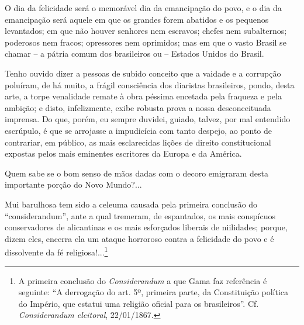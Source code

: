 O dia da felicidade será o memorável dia da emancipação do povo, e o dia
da emancipação será aquele em que os grandes forem abatidos e os
pequenos levantados; em que não houver senhores nem escravos; chefes nem
subalternos; poderosos nem fracos; opressores nem oprimidos; mas em que
o vasto Brasil se chamar -- a pátria comum dos brasileiros ou -- Estados
Unidos do Brasil.

Tenho ouvido dizer a pessoas de subido conceito que a vaidade e a
corrupção poluíram, de há muito, a frágil consciência dos diaristas
brasileiros, pondo, desta arte, a torpe venalidade remate à obra péssima
encetada pela fraqueza e pela ambição; e disto, infelizmente, exibe
robusta prova a nossa desconceituada imprensa. Do que, porém, eu sempre
duvidei, guiado, talvez, por mal entendido escrúpulo, é que se arrojasse
a impudicícia com tanto despejo, ao ponto de contrariar, em público, as
mais esclarecidas lições de direito constitucional expostas pelos mais
eminentes escritores da Europa e da América.

Quem sabe se o bom senso de mãos dadas com o decoro emigraram desta
importante porção do Novo Mundo?...

Mui barulhosa tem sido a celeuma causada pela primeira conclusão do
``considerandum'', ante a qual tremeram, de espantados, os mais conspícuos
conservadores de alicantinas e os mais esforçados liberais de
niilidades; porque, dizem eles, encerra ela um ataque horroroso contra a
felicidade do povo e é dissolvente da fé religiosa!...\footnote{A
  primeira conclusão do \emph{Considerandum} a que Gama faz referência é
  seguinte: ``A derrogação do art. 5º, primeira parte, da Constituição
  política do Império, que estatui uma religião oficial para os
  brasileiros''. Cf. \emph{Considerandum eleitoral}, 22/01/1867.}

